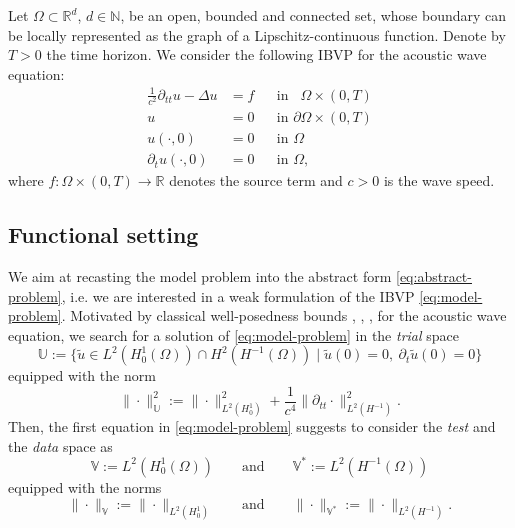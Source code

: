 \documentclass{amsart}
\theoremstyle{plain}
\theoremstyle{remark}
\numberwithin{equation}{section}
\numberwithin{theorem}{section}
\newcommand{\R}{\mathbb{R}}
\newcommand{\N}{\mathbb{N}}
\newcommand{\Domain}{\Omega}
\newcommand{\trial}{\mathbb{U}}
\newcommand{\test}{\mathbb{V}}
\newcommand{\data}{\mathbb{V}^*}
\begin{document}
Let $\Domain\subset\R^d$, $d\in\N$, be an open, bounded and connected set, whose boundary can be locally represented as the graph of a Lipschitz-continuous function. Denote by $T>0$ the time horizon. We consider the following IBVP for the acoustic wave equation:
\begin{equation}
	\label{eq:model-problem}
		\begin{aligned}
			 \frac{1}{c^2}\partial_{tt}u - \Delta u & = f && \text{in } \phantom{\partial } \Omega \times (0,T) \\
			u & = 0 && \text{in } \partial \Omega \times (0,T) \\
			u(\cdot, 0) & = 0 && \text{in } \Omega \\
			\partial_t u(\cdot, 0) & = 0 && \text{in } \Omega,
		\end{aligned}
\end{equation}
where $f: \Omega \times (0,T) \to \R$ denotes the source term and $c > 0$ is the wave speed.

\subsection{Functional setting}
\label{SS:functional-setting}
We aim at recasting the model problem into the abstract form \eqref{eq:abstract-problem}, i.e. we are interested in a weak formulation of the IBVP \eqref{eq:model-problem}. 
Motivated by classical well-posedness bounds \cite[Chapter XVIII, Section $5$]{Dautray.Lions:92}, \cite[Section $7.2$]{Evans:10}, \cite[Theorem 3.2]{Ladyzhenskaya:85}, \cite[Theorem 8.1]{Lions.Magenes:72} for the acoustic wave equation, we search for a solution of \eqref{eq:model-problem} in the \emph{trial} space
\begin{equation}
	\label{eq:WaveTrialSpace}
	\trial := \{\widetilde{u} \in L^2(H^1_0(\Omega)) \cap H^2(H^{-1}(\Omega)) \mid \widetilde u(0) = 0, \: \partial_t \widetilde u(0) = 0 \}
\end{equation}
equipped with the norm
\begin{equation}
	\label{eq:WaveTrialNorm}
	\|\cdot\|^2_\trial:=\|\cdot\|^2_{L^2(H^1_0)} + \frac{1}{c^4}\|\partial_{tt} \cdot\|^2_{L^2(H^{-1})}.
\end{equation}
Then, the first equation in \eqref{eq:model-problem} suggests to consider the \emph{test} and the \emph{data} space as
\begin{equation*}
\label{eq:WaveTestDataSpace}
\test := L^2(H^{1}_0(\Omega)) \qquad \text{and} \qquad \data := L^2(H^{-1}(\Omega))	
\end{equation*}
equipped with the norms 
\begin{equation}
\label{eq:WaveTestDataNorm}
\|\cdot\|_{\test} := \|\cdot\|_{L^2(H^1_0)}  
\qquad \text{and} \qquad
\|\cdot\|_{\data} := \|\cdot\|_{L^2(H^{-1})}.
\end{equation}
\end{document}

